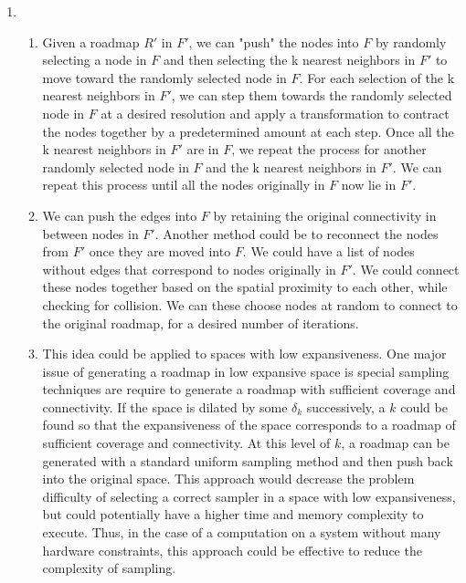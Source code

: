 \documentclass[11pt]{article}
\begin{document}
\begin{enumerate}[leftmargin=0.3in]
\begin{enumerate}
   \end{enumerate} %
  
   \item %
   \begin{enumerate}
       \item Given a roadmap $R'$ in $F'$, we can "push" the nodes into $F$ by randomly selecting a node in $F$ and then selecting the k nearest neighbors in $F'$ to move toward the randomly selected node in $F$. For each selection of the k nearest neighbors in $F'$, we can step them towards the randomly selected node in $F$ at a desired resolution and apply a transformation to contract the nodes together by a predetermined amount at each step. Once all the k nearest neighbors in $F'$ are in $F$, we repeat the process for another randomly selected node in $F$ and the k nearest neighbors in $F'$. We can repeat this process until all the nodes originally in $F$ now lie in $F'$.

       \item We can push the edges into $F$ by retaining the original connectivity in between nodes in $F'$. Another method could be to reconnect the nodes from $F'$ once they are moved into $F$. We could have a list of nodes without edges that correspond to nodes originally in $F'$. We could connect these nodes together based on the spatial proximity to each other, while checking for collision. We can these choose nodes at random to connect to the original roadmap, for a desired number of iterations.

       \item This idea could be applied to spaces with low expansiveness. One major issue of generating a roadmap in low expansive space is special sampling techniques are require to generate a roadmap with sufficient coverage and connectivity. If the space is dilated by some $\delta_k$ successively, a $k$ could be found so that the expansiveness of the space corresponds to a roadmap of sufficient coverage and connectivity. At this level of $k$, a roadmap can be generated with a standard uniform sampling method and then push back into the original space. This approach would decrease the problem difficulty of selecting a correct sampler in a space with low expansiveness, but could potentially have a higher time and memory complexity to execute. Thus, in the case of a computation on a system without many hardware constraints, this approach could be effective to reduce the complexity of sampling. 

   \end{enumerate} %
   

\end{enumerate}
\end{document}

